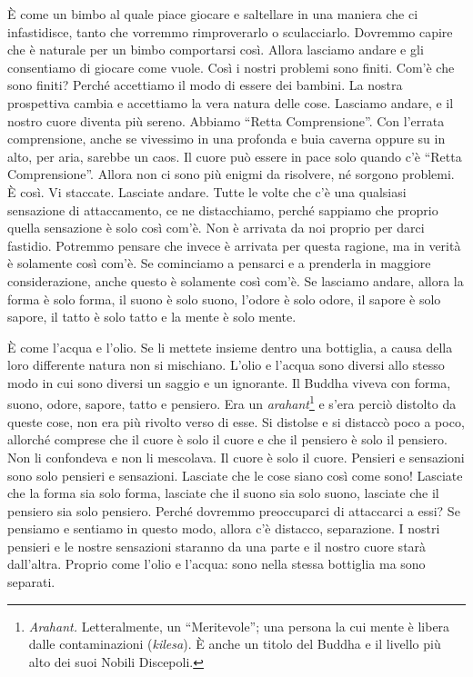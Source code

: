 È come un bimbo al quale piace giocare e saltellare in una maniera che
ci infastidisce, tanto che vorremmo rimproverarlo o sculacciarlo.
Dovremmo capire che è naturale per un bimbo comportarsi così. Allora
lasciamo andare e gli consentiamo di giocare come vuole. Così i nostri
problemi sono finiti. Com'è che sono finiti? Perché accettiamo il modo
di essere dei bambini. La nostra prospettiva cambia e accettiamo la vera
natura delle cose. Lasciamo andare, e il nostro cuore diventa più
sereno. Abbiamo ``Retta Comprensione''. Con l'errata comprensione, anche
se vivessimo in una profonda e buia caverna oppure su in alto, per aria,
sarebbe un caos. Il cuore può essere in pace solo quando c'è ``Retta
Comprensione''. Allora non ci sono più enigmi da risolvere, né sorgono
problemi. È così. Vi staccate. Lasciate andare. Tutte le volte che c'è
una qualsiasi sensazione di attaccamento, ce ne distacchiamo, perché
sappiamo che proprio quella sensazione è solo così com'è. Non è arrivata
da noi proprio per darci fastidio. Potremmo pensare che invece è
arrivata per questa ragione, ma in verità è solamente così com'è. Se
cominciamo a pensarci e a prenderla in maggiore considerazione, anche
questo è solamente così com'è. Se lasciamo andare, allora la forma è
solo forma, il suono è solo suono, l'odore è solo odore, il sapore è
solo sapore, il tatto è solo tatto e la mente è solo mente.

È come l'acqua e l'olio. Se li mettete insieme dentro una bottiglia, a
causa della loro differente natura non si mischiano. L'olio e l'acqua
sono diversi allo stesso modo in cui sono diversi un saggio e un
ignorante. Il Buddha viveva con forma, suono, odore, sapore, tatto e
pensiero. Era un \emph{arahant}\footnote{\emph{Arahant.} Letteralmente,
  un ``Meritevole''; una persona la cui mente è libera dalle
  contaminazioni (\emph{kilesa}). È anche un titolo del Buddha e il
  livello più alto dei suoi Nobili Discepoli.} e s'era perciò distolto
da queste cose, non era più rivolto verso di esse. Si distolse e si
distaccò poco a poco, allorché comprese che il cuore è solo il cuore e
che il pensiero è solo il pensiero. Non li confondeva e non li
mescolava. Il cuore è solo il cuore. Pensieri e sensazioni sono solo
pensieri e sensazioni. Lasciate che le cose siano così come sono!
Lasciate che la forma sia solo forma, lasciate che il suono sia solo
suono, lasciate che il pensiero sia solo pensiero. Perché dovremmo
preoccuparci di attaccarci a essi? Se pensiamo e sentiamo in questo
modo, allora c'è distacco, separazione. I nostri pensieri e le nostre
sensazioni staranno da una parte e il nostro cuore starà dall'altra.
Proprio come l'olio e l'acqua: sono nella stessa bottiglia ma sono
separati.

